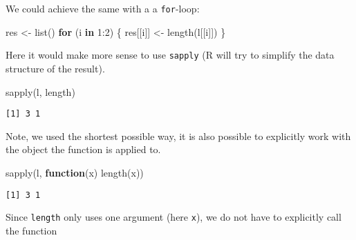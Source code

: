 \documentclass[ignorenonframetext,,t]{beamer}
\let\oldtextbf\textbf
\renewcommand{\textbf}[1]{\textcolor{spamwell}{\oldtextbf{#1}}}
\newenvironment{Shaded}{\begin{snugshade}}{\end{snugshade}}
\newcommand{\ControlFlowTok}[1]{\textcolor[rgb]{0.13,0.29,0.53}{\textbf{#1}}}
\newcommand{\DecValTok}[1]{\textcolor[rgb]{0.00,0.00,0.81}{#1}}
\newcommand{\FunctionTok}[1]{\textcolor[rgb]{0.00,0.00,0.00}{#1}}
\newcommand{\NormalTok}[1]{#1}
\newcommand{\OtherTok}[1]{\textcolor[rgb]{0.56,0.35,0.01}{#1}}
\newcommand{\SpecialCharTok}[1]{\textcolor[rgb]{0.00,0.00,0.00}{#1}}
\begin{document}
\begin{frame}[fragile]
We could achieve the same with a a \texttt{for}-loop:

\begin{Shaded}
\begin{Highlighting}[]
\NormalTok{res }\OtherTok{\textless{}{-}} \FunctionTok{list}\NormalTok{()}
\ControlFlowTok{for}\NormalTok{ (i }\ControlFlowTok{in} \DecValTok{1}\SpecialCharTok{:}\DecValTok{2}\NormalTok{) \{}
\NormalTok{  res[[i]] }\OtherTok{\textless{}{-}} \FunctionTok{length}\NormalTok{(l[[i]])}
\NormalTok{\}}
\end{Highlighting}
\end{Shaded}
\end{frame}

\begin{frame}[fragile]
Here it would make more sense to use \texttt{sapply} (R will try to
simplify the data structure of the result).

\begin{Shaded}
\begin{Highlighting}[]
\FunctionTok{sapply}\NormalTok{(l, length)}
\end{Highlighting}
\end{Shaded}

\begin{verbatim}
[1] 3 1
\end{verbatim}
\end{frame}

\begin{frame}[fragile]
Note, we used the shortest possible way, it is also possible to
explicitly work with the object the function is applied to.

\begin{Shaded}
\begin{Highlighting}[]
\FunctionTok{sapply}\NormalTok{(l, }\ControlFlowTok{function}\NormalTok{(x) }\FunctionTok{length}\NormalTok{(x))}
\end{Highlighting}
\end{Shaded}

\begin{verbatim}
[1] 3 1
\end{verbatim}

Since \texttt{length} only uses one argument (here \texttt{x}), we do
not have to explicitly call the function
\end{frame}
\end{document}

